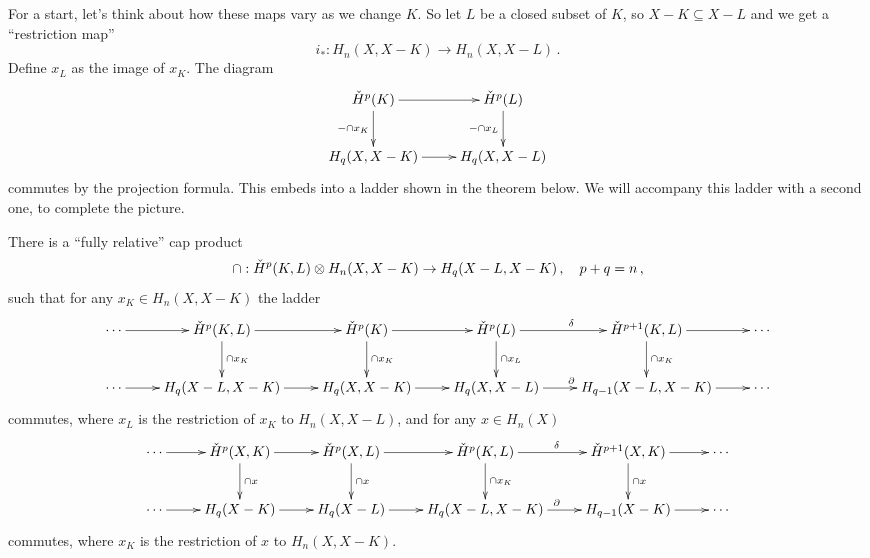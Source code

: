 For a start, let's think about how these maps vary as we change $K$.
So let $L$ be a closed subset of $K$, so $X-K\subseteq X-L$ and we get 
a ``restriction map''
\[
i_\ast:H_n(X,X-K)\to H_n(X,X-L)\,.
\]
Define $x_L$ as the image of $x_K$. The diagram
\begin{equation*}
\xymatrix{
\cHH^p(K)\ar[r]\ar[d]_{-\cap x_K} & \cHH^p(L) \ar[d]_{-\cap x_L} \\
H_q(X,X-K)\ar[r] & H_q(X,X-L)
}
\end{equation*}
commutes by the projection formula. This embeds into a ladder
shown in the theorem below. We will accompany this ladder with a second
one, to complete the picture.
\begin{theorem}
There is a ``fully relative'' cap product
\[
\cap:\check{H}^p(K,L)\otimes H_n(X,X-K)\to H_q(X-L,X-K)\,,\quad p+q=n\,,
\]
such that for any $x_K\in H_n(X,X-K)$ the ladder
\begin{equation*}
\xymatrix{
\cdots \ar[r] & \cHH^p(K,L)\ar[r]\ar[d]^{\cap x_{K}} & \cHH^p(K)\ar[r]\ar[d]^{\cap x_K} & \cHH^p(L)\ar[r]^\delta\ar[d]^{\cap x_L} & \cHH^{p+1}(K,L)\ar[r]\ar[d]^{\cap x_{K}} & \cdots\\
	\cdots\ar[r] & H_q(X-L,X-K)\ar[r]& H_q(X,X-K)\ar[r] & H_q(X,X-L)\ar[r]^\partial & H_{q-1}(X-L,X-K)\ar[r] & \cdots
}
\end{equation*}
commutes, where $x_L$ is the restriction of $x_K$ to $H_n(X,X-L)$, 
and for any $x\in H_n(X)$
\[
\xymatrix{
\cdots \ar[r] & \cHH^p(X,K) \ar[d]^{\cap x} \ar[r] & 
\cHH^p(X,L) \ar[d]^{\cap x} \ar[r] & 
\cHH^p(K,L) \ar[d]^{\cap x_K} \ar[r]^\delta &
\cHH^{p+1}(X,K) \ar[d]^{\cap x} \ar[r] & \cdots\\
\cdots \ar[r] & H_q(X-K) \ar[r] & H_q(X-L) \ar[r] & 
H_q(X-L,X-K) \ar[r]^\partial & H_{q-1}(X-K) \ar[r] & \cdots
}\]
commutes, where $x_K$ is the restriction of $x$ to $H_n(X,X-K)$. 
\end{theorem}

